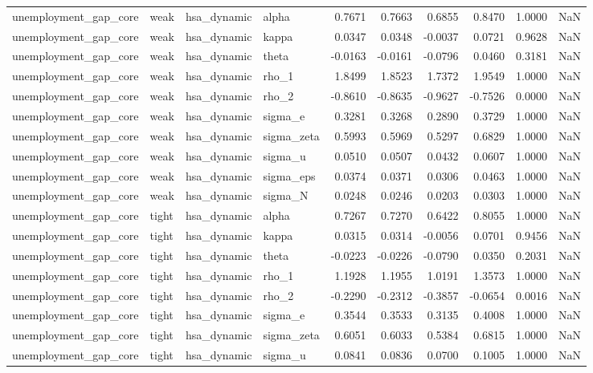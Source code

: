 \begin{tabular}{llllrrrrrl}
unemployment\_gap\_core & weak & hsa\_dynamic & alpha & 0.7671 & 0.7663 & 0.6855 & 0.8470 & 1.0000 & NaN \\
unemployment\_gap\_core & weak & hsa\_dynamic & kappa & 0.0347 & 0.0348 & -0.0037 & 0.0721 & 0.9628 & NaN \\
unemployment\_gap\_core & weak & hsa\_dynamic & theta & -0.0163 & -0.0161 & -0.0796 & 0.0460 & 0.3181 & NaN \\
unemployment\_gap\_core & weak & hsa\_dynamic & rho\_1 & 1.8499 & 1.8523 & 1.7372 & 1.9549 & 1.0000 & NaN \\
unemployment\_gap\_core & weak & hsa\_dynamic & rho\_2 & -0.8610 & -0.8635 & -0.9627 & -0.7526 & 0.0000 & NaN \\
unemployment\_gap\_core & weak & hsa\_dynamic & sigma\_e & 0.3281 & 0.3268 & 0.2890 & 0.3729 & 1.0000 & NaN \\
unemployment\_gap\_core & weak & hsa\_dynamic & sigma\_zeta & 0.5993 & 0.5969 & 0.5297 & 0.6829 & 1.0000 & NaN \\
unemployment\_gap\_core & weak & hsa\_dynamic & sigma\_u & 0.0510 & 0.0507 & 0.0432 & 0.0607 & 1.0000 & NaN \\
unemployment\_gap\_core & weak & hsa\_dynamic & sigma\_eps & 0.0374 & 0.0371 & 0.0306 & 0.0463 & 1.0000 & NaN \\
unemployment\_gap\_core & weak & hsa\_dynamic & sigma\_N & 0.0248 & 0.0246 & 0.0203 & 0.0303 & 1.0000 & NaN \\
unemployment\_gap\_core & tight & hsa\_dynamic & alpha & 0.7267 & 0.7270 & 0.6422 & 0.8055 & 1.0000 & NaN \\
unemployment\_gap\_core & tight & hsa\_dynamic & kappa & 0.0315 & 0.0314 & -0.0056 & 0.0701 & 0.9456 & NaN \\
unemployment\_gap\_core & tight & hsa\_dynamic & theta & -0.0223 & -0.0226 & -0.0790 & 0.0350 & 0.2031 & NaN \\
unemployment\_gap\_core & tight & hsa\_dynamic & rho\_1 & 1.1928 & 1.1955 & 1.0191 & 1.3573 & 1.0000 & NaN \\
unemployment\_gap\_core & tight & hsa\_dynamic & rho\_2 & -0.2290 & -0.2312 & -0.3857 & -0.0654 & 0.0016 & NaN \\
unemployment\_gap\_core & tight & hsa\_dynamic & sigma\_e & 0.3544 & 0.3533 & 0.3135 & 0.4008 & 1.0000 & NaN \\
unemployment\_gap\_core & tight & hsa\_dynamic & sigma\_zeta & 0.6051 & 0.6033 & 0.5384 & 0.6815 & 1.0000 & NaN \\
unemployment\_gap\_core & tight & hsa\_dynamic & sigma\_u & 0.0841 & 0.0836 & 0.0700 & 0.1005 & 1.0000 & NaN \\

\end{tabular}
